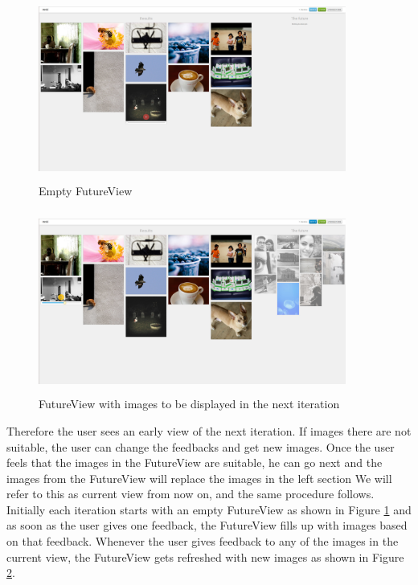\documentclass[english]{tktltiki}
\begin{document}
\begin{figure}[h!]
  \centering
    \includegraphics[width=0.90\textwidth,height=6cm]{figures/future_sample_1.jpg}
    \caption{Empty FutureView}
    \label{fut_samp_1}
\end{figure}

\begin{figure}[h!]
  \centering
    \includegraphics[width=0.90\textwidth,height=6cm]{figures/future_sample_2.jpg}
    \caption{FutureView with images to be displayed in the next iteration}
    \label{fut_samp_2}
\end{figure}

Therefore the user sees an early view of the next iteration. If images there are not suitable, the user can change the feedbacks and get new images. Once the user feels that the images in the FutureView are suitable, he can go next and the images from the FutureView will replace the images in the left section We will refer to this as current view from now on, and the same procedure follows. Initially each iteration starts with an empty FutureView as shown in Figure \ref{fut_samp_1} and as soon as the user gives one feedback, the FutureView fills up with images based on that feedback. Whenever the user gives feedback to any of the images in the current view, the FutureView gets refreshed with new images as shown in Figure \ref{fut_samp_2}.
\end{document}
